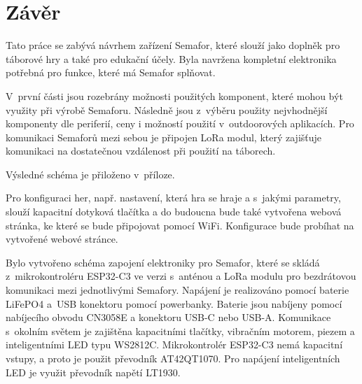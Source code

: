 \chapter*{Závěr}
{}
Tato práce se zabývá návrhem zařízení Semafor, které slouží jako doplněk pro táborové hry a také pro edukační účely. Byla navržena kompletní 
elektronika potřebná pro funkce, které má Semafor splňovat. 

V~první části jsou rozebrány možnosti použitých komponent, které mohou být využity při výrobě Semaforu. Následně jsou z~výběru použity 
nejvhodnější komponenty dle periferií, ceny i možností použití v~outdoorových aplikacích.
Pro komunikaci Semaforů mezi sebou je připojen LoRa modul, který zajišťuje komunikaci na dostatečnou vzdálenost při použití na táborech. 

Výsledné schéma je přiloženo v~příloze. 

Pro konfiguraci her, např. nastavení, která hra se hraje a s~jakými parametry, slouží kapacitní dotyková tlačítka a do budoucna bude také 
vytvořena webová stránka, ke které se bude připojovat pomocí WiFi. Konfigurace bude probíhat na vytvořené webové stránce. 

Bylo vytvořeno schéma zapojení elektroniky pro Semafor, které se skládá z~mikrokontroléru ESP32-C3 ve verzi s~anténou a LoRa modulu pro 
bezdrátovou komunikaci mezi jednotlivými Semafory. Napájení je realizováno pomocí baterie LiFePO4 a~USB konektoru pomocí powerbanky. Baterie 
jsou nabíjeny pomocí nabíjecího obvodu CN3058E a konektoru USB-C nebo USB-A. Komunikace s~okolním světem je zajištěna kapacitními tlačítky, 
vibračním motorem, piezem a inteligentními LED typu WS2812C. Mikrokontrolér ESP32-C3 nemá kapacitní vstupy, a proto je použit převodník AT42QT1070.
Pro napájení inteligentních LED je využit převodník napětí LT1930. 

